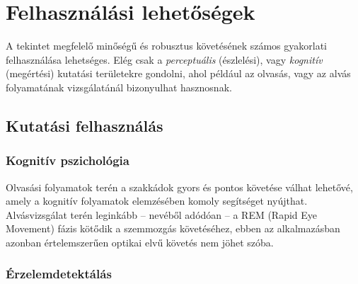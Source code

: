 \chapter{Felhasználási lehetőségek}\label{sect:felhasznalas}

A tekintet megfelelő minőségű és robusztus követésének számos gyakorlati felhasználása lehetséges. Elég csak a \emph{perceptuális} (észlelési), vagy \emph{kognitív} (megértési) kutatási területekre gondolni, ahol például az olvasás, vagy az alvás folyamatának vizsgálatánál bizonyulhat hasznosnak.




\section{Kutatási felhasználás}\label{sect:tudomanyos}


\subsection{Kognitív pszichológia}\label{sect:kognitiv}

Olvasási folyamatok terén a szakkádok gyors és pontos követése válhat lehetővé, amely a kognitív folyamatok elemzésében komoly segítséget nyújthat. Alvásvizsgálat terén leginkább -- nevéből adódóan -- a REM (Rapid Eye Movement) fázis kötődik a szemmozgás követéséhez, ebben az alkalmazásban azonban értelemszerűen optikai elvű követés nem jöhet szóba.

\subsection{Érzelemdetektálás}\label{sect:erzelem}


